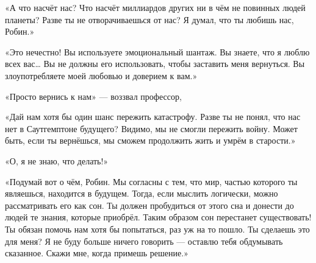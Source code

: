 \documentclass[a4paper,12pt]{book}
\begin{document}
\par
«А что насчёт нас? Что насчёт миллиардов других ни в чём не повинных людей планеты? Разве ты не отворачиваешься от нас? Я думал, что ты любишь нас, Робин.»
\par
«Это нечестно! Вы используете эмоциональный шантаж. Вы знаете, что я люблю всех вас… Вы не должны его использовать, чтобы заставить меня вернуться. Вы злоупотребляете моей любовью и доверием к вам.»
\par
«Просто вернись к нам» — воззвал профессор,
\par
«Дай нам хотя бы один шанс пережить катастрофу. Разве ты не понял, что нас нет в Саутгемптоне будущего? Видимо, мы не смогли пережить войну. Может быть, если ты вернёшься, мы сможем продолжить жить и умрём в старости.»
\par
«О, я не знаю, что делать!»
\par
«Подумай вот о чём, Робин. Мы согласны с тем, что мир, частью которого ты являешься, находится в будущем. Тогда, если мыслить логически, можно рассматривать его как сон. Ты должен пробудиться от этого сна и донести до людей те знания, которые приобрёл. Таким образом сон перестанет существовать! Ты обязан помочь нам хотя бы попытаться, раз уж на то пошло. Ты сделаешь это для меня? Я не буду больше ничего говорить — оставлю тебя обдумывать сказанное. Скажи мне, когда примешь решение.»\\
\end{document}
